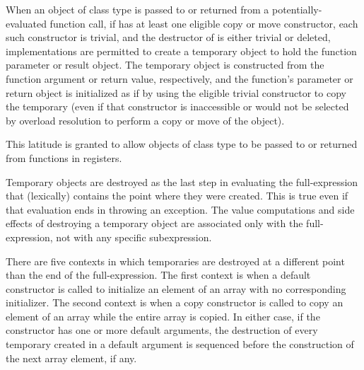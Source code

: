 \pnum
When an object of class type 
is passed to or returned from a potentially-evaluated function call,
if  has at least one eligible copy or move constructor,
each such constructor is trivial,
and the destructor of  is either trivial or deleted,
implementations are permitted
to create a temporary object
to hold the function parameter or result object.
The temporary object is constructed
from the function argument or return value, respectively,
and the function's parameter or return object
is initialized as if by
using the eligible trivial constructor to copy the temporary
(even if that constructor is inaccessible
or would not be selected by overload resolution
to perform a copy or move of the object).
\begin{note}
This latitude is granted to allow objects of class type to be passed to or returned from functions in registers.
\end{note}

\pnum
{}%
%
%
Temporary objects are destroyed as the last step
in evaluating
the full-expression
that (lexically) contains the point where
they were created.
This is true even if that evaluation ends in throwing an exception.
The
%
value computations and
%
side effects of destroying a temporary object
are associated only with the full-expression, not with any specific
subexpression.

\pnum
{}%
%
There are five contexts in which temporaries are destroyed at a different
point than the end of the full-expression.
The first context is when a default constructor is called to initialize
an element of an array with no corresponding initializer.
The second context is when a copy constructor is called to copy an element of
an array while the entire array is copied.
In either case, if the constructor has one or more default arguments,
the destruction of every temporary created in a default argument is
sequenced before the construction of the next array element, if any.

